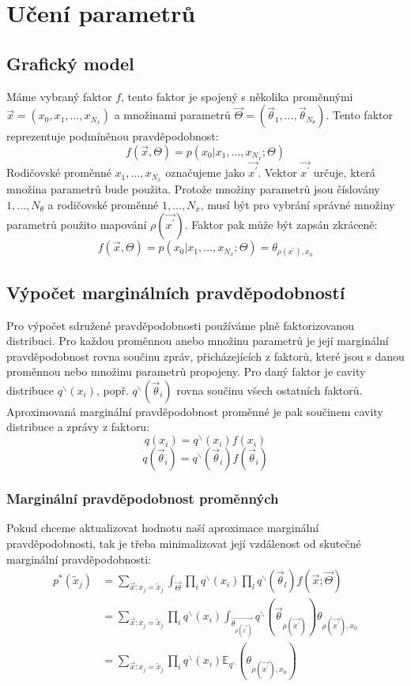 \chapter{Učení parametrů}

\section{Grafický model}

Máme vybraný faktor $f$, tento faktor je spojený s několika proměnnými
$\vec{x} = (x_0, x_1, \dots, x_{N_x})$
a množinami parametrů
$\vec{\Theta} = (\vec{\theta}_1, \dots, \vec{\theta}_{N_\theta})$.
Tento faktor reprezentuje podmíněnou pravděpodobnost:
$$f(\vec{x}, \Theta) = p(x_0 | x_1, \dots, x_{N_x}; \Theta)$$
Rodičovské proměnné $x_1, \dots, x_{N_x}$ označujeme jako $\vec{x^\prime}$.
Vektor $\vec{x^\prime}$ určuje, která množina parametrů bude použita.
Protože množiny parametrů jsou číslovány $1, \dots, N_\theta$ a rodičovské
proměnné $1, \dots, N_x$, musí být pro vybrání správné množiny parametrů
použito mapování $\rho(\vec{x^\prime})$.
Faktor pak může být zapsán zkráceně:
$$f(\vec{x}, \Theta) = p(x_0 | x_1, \dots, x_{N_x}; \Theta) =
\theta_{\rho(x^\prime), x_0}$$

\section{Výpočet marginálních pravděpodobností}

Pro výpočet sdružené pravděpodobnosti používáme plně faktorizovanou distribuci.
Pro každou proměnnou anebo množinu parametrů je její marginální pravděpodobnost
rovna součinu zpráv, přicházejících z faktorů, které jsou s danou proměnnou
nebo množinu parametrů propojeny.
Pro daný faktor je cavity distribuce $q^\backslash(x_i)$, popř.
$q^\backslash(\vec{\theta}_i)$ rovna součinu všech ostatních faktorů.
Aproximovaná marginální pravděpodobnost proměnné je pak součinem cavity
distribuce a zprávy z faktoru:
$$q(x_i) = q^\backslash(x_i) f(x_i)$$
$$q(\vec{\theta}_i) = q^\backslash(\vec{\theta}_i) f(\vec{\theta}_i)$$

\subsection{Marginální pravděpodobnost proměnných}

Pokud chceme aktualizovat hodnotu naší aproximace marginální pravděpodobnosti,
tak je třeba minimalizovat její vzdálenost od skutečné marginální
pravděpodobnosti:
\begin{align}
p^*(\tilde{x}_j) & = \sum_{\vec{x}: x_j = \tilde{x}_j} \int_{\vec{\Theta}}
    \prod_i q^\backslash(x_i) \prod_l q^\backslash(\vec{\theta}_l) f(\vec{x};
    \vec{\Theta}) \\
& = \sum_{\vec{x}: x_j = \tilde{x}_j} \prod_i q^\backslash(x_i)
    \int_{\vec{\theta_{\rho(\vec{x^\prime})}}}
    q^\backslash(\vec{\theta}_{\rho(\vec{x^\prime})})
    \theta_{\rho(\vec{x^\prime}), x_0} \\
& = \sum_{\vec{x}: x_j = \tilde{x}_j} \prod_i q^\backslash(x_i)
    \mathbb{E}_{q^\backslash} (\theta_{\rho(\vec{x^\prime}), x_0})
\end{align}

